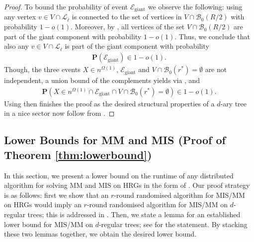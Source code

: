 \documentclass[letterpaper,11pt]{article}
\newcommand{\Prob}[1]{\mathbf{P}\left(#1\right)}
\newcommand{\B}{\mathcal B}
\newcommand{\1}{\mathbb I}
\newcommand{\Layer}[1]{\mathcal{L}_{#1}}
\begin{document}
\begin{proof}
To bound the probability of event $\mathcal{E}_{\text{giant}}$ we observe the following: using \cite[Lemma 5.3]{Krohmer2016} any vertex $v \in V \cap \Layer{\overline{\ell}}$ is connected to the set of vertices in $V \cap \B_0(R/2)$ with probability $1-o(1)$. Moreover, by \cite[Theorem 1.4]{bfm-giant-15}, all vertices of the set $V \cap \B_0(R/2)$ are part of the giant component with probability $1-o(1)$. Thus, we conclude that also any $v \in V \cap \Layer{\overline{\ell}}$ is part of the giant component with probability  
\begin{align}\label{eq:giant}
\Prob{\mathcal{E}_{\text{giant}}} \in 1-o(1).    
\end{align}
%
Though, the three events $X \in n^{\Omega(1)}$, $\mathcal{E}_{\text{giant}}$ and $V\cap \B_0(r^*) = \emptyset$ are not independent, a union bound of the complements yields via ,  and 
%
\begin{align}\label{eq:wrap-up}
\Prob{X \in n^{\Omega(1)} \cap \mathcal{E}_{\text{giant}} \cap V \cap \B_0(r^*) = \emptyset} \in 1 - o(1).   
\end{align}
%
 Using  then finishes the proof as the desired structural properties of a $d$-ary tree in a nice sector now follow from .
\end{proof}
%
\subsection{Lower Bounds for MM and MIS (Proof of Theorem \ref{thm:lowerbound})}\label{sec:lower-bound-corollary}
\newcommand{\algohrg}[0]{A_{\text{hrg}}}
\newcommand{\algotree}[0]{A_{\text{tree}}}
%
In this section, we present a lower bound on the runtime of any distributed algorithm for solving MM and MIS on HRGs in the form of . Our proof strategy is as follows: first we show that an $r$-round randomised algorithm for MIS/MM on HRGs would imply an $r$-round randomised algorithm for MIS/MM on $d$-regular trees; this is addressed in . Then, we state a lemma for an established lower bound for MIS/MM on $d$-regular trees; see  for the statement. By stacking these two lemmas together, we obtain the desired lower bound.
\end{document}
